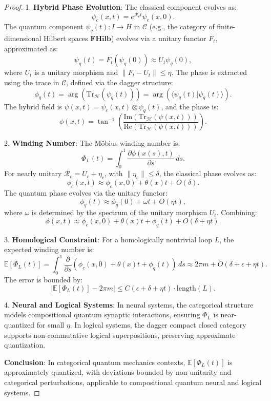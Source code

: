 \documentclass[12pt]{article}
\begin{document}
\begin{proof}

1. \textbf{Hybrid Phase Evolution}:
   The classical component evolves as:
   \[
   \psi_c(x,t) = e^{\mathcal{R}_c t} \psi_c(x,0).
   \]
   The quantum component \(\psi_q(t): I \to H\) in \(\mathcal{C}\) (e.g., the category of finite-dimensional Hilbert spaces \(\mathbf{FHilb}\)) evolves via a unitary functor \(F_t\), approximated as:
   \[
   \psi_q(t) = F_t(\psi_q(0)) \approx U_t \psi_q(0),
   \]
   where \(U_t\) is a unitary morphism and \(\|F_t - U_t\| \leq \eta\). The phase is extracted using the trace in \(\mathcal{C}\), defined via the dagger structure:
   \[
   \phi_q(t) = \arg(\text{Tr}_{\mathcal{H}}(\psi_q(t))) = \arg(\langle \psi_q(t) | \psi_q(t) \rangle).
   \]
   The hybrid field is \(\psi(x,t) = \psi_c(x,t) \otimes \psi_q(t)\), and the phase is:
   \[
   \phi(x,t) = \tan^{-1}\left( \frac{\text{Im}(\text{Tr}_{\mathcal{H}}(\psi(x,t)))}{\text{Re}(\text{Tr}_{\mathcal{H}}(\psi(x,t)))} \right).
   \]

2. \textbf{Winding Number}:
   The Möbius winding number is:
   \[
   \Phi_L(t) = \int_0^1 \frac{\partial \phi(x(s),t)}{\partial s} \, ds.
   \]
   For nearly unitary \(\mathcal{R}_c = U_c + \eta_c\), with \(\|\eta_c\| \leq \delta\), the classical phase evolves as:
   \[
   \phi_c(x,t) \approx \phi_c(x,0) + \theta(x)t + O(\delta).
   \]
   The quantum phase evolves via the unitary functor:
   \[
   \phi_q(t) \approx \phi_q(0) + \omega t + O(\eta t),
   \]
   where \(\omega\) is determined by the spectrum of the unitary morphism \(U_t\). Combining:
   \[
   \phi(x,t) \approx \phi_c(x,0) + \theta(x)t + \phi_q(t) + O(\delta + \eta t).
   \]

3. \textbf{Homological Constraint}:
   For a homologically nontrivial loop \(L\), the expected winding number is:
   \[
   \mathbb{E}[\Phi_L(t)] = \int_0^1 \frac{\partial}{\partial s} \left( \phi_c(x,0) + \theta(x)t + \phi_q(t) \right) \, ds \approx 2\pi m + O(\delta + \epsilon + \eta t).
   \]
   The error is bounded by:
   \[
   \left| \mathbb{E}[\Phi_L(t)] - 2\pi m \right| \leq C (\epsilon + \delta + \eta t) \cdot \text{length}(L).
   \]

4. \textbf{Neural and Logical Systems}:
   In neural systems, the categorical structure models compositional quantum synaptic interactions, ensuring \(\Phi_L\) is near-quantized for small \(\eta\). In logical systems, the dagger compact closed category supports non-commutative logical superpositions, preserving approximate quantization.

\textbf{Conclusion}: In categorical quantum mechanics contexts, \(\mathbb{E}[\Phi_L(t)]\) is approximately quantized, with deviations bounded by non-unitarity and categorical perturbations, applicable to compositional quantum neural and logical systems.

\end{proof}
\end{document}
